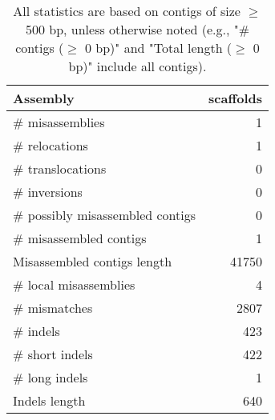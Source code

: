 \documentclass[12pt,a4paper]{article}
\begin{document}
\begin{table}[ht]
\begin{center}
\caption{All statistics are based on contigs of size $\geq$ 500 bp, unless otherwise noted (e.g., "\# contigs ($\geq$ 0 bp)" and "Total length ($\geq$ 0 bp)" include all contigs).}
\begin{tabular}{|l*{1}{|r}|}
\hline
Assembly & scaffolds \\ \hline
\# misassemblies & 1 \\ \hline
\hspace{5mm}\# relocations & 1 \\ \hline
\hspace{5mm}\# translocations & 0 \\ \hline
\hspace{5mm}\# inversions & 0 \\ \hline
\# possibly misassembled contigs & 0 \\ \hline
\# misassembled contigs & 1 \\ \hline
Misassembled contigs length & 41750 \\ \hline
\# local misassemblies & 4 \\ \hline
\# mismatches & 2807 \\ \hline
\# indels & 423 \\ \hline
\hspace{5mm}\# short indels & 422 \\ \hline
\hspace{5mm}\# long indels & 1 \\ \hline
Indels length & 640 \\ \hline
\end{tabular}
\end{center}
\end{table}
\end{document}

